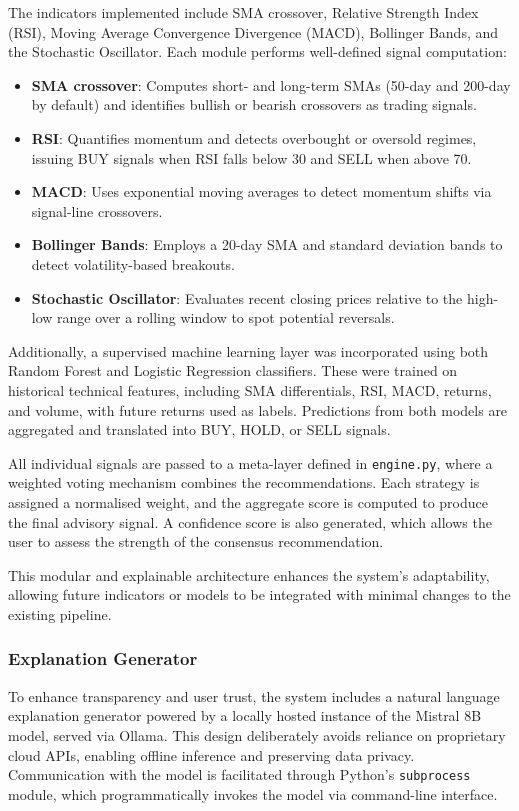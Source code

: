 The indicators implemented include SMA crossover, Relative Strength Index (RSI), Moving Average Convergence Divergence (MACD), Bollinger Bands, and the Stochastic Oscillator. Each module performs well-defined signal computation:
\begin{itemize}
\item \textbf{SMA crossover}: Computes short- and long-term SMAs (50-day and 200-day by default) and identifies bullish or bearish crossovers as trading signals.
\item \textbf{RSI}: Quantifies momentum and detects overbought or oversold regimes, issuing BUY signals when RSI falls below 30 and SELL when above 70.
\item \textbf{MACD}: Uses exponential moving averages to detect momentum shifts via signal-line crossovers.
\item \textbf{Bollinger Bands}: Employs a 20-day SMA and standard deviation bands to detect volatility-based breakouts.
\item \textbf{Stochastic Oscillator}: Evaluates recent closing prices relative to the high-low range over a rolling window to spot potential reversals.
\end{itemize}

Additionally, a supervised machine learning layer was incorporated using both Random Forest and Logistic Regression classifiers. These were trained on historical technical features, including SMA differentials, RSI, MACD, returns, and volume, with future returns used as labels. Predictions from both models are aggregated and translated into BUY, HOLD, or SELL signals.

All individual signals are passed to a meta-layer defined in \texttt{engine.py}, where a weighted voting mechanism combines the recommendations. Each strategy is assigned a normalised weight, and the aggregate score is computed to produce the final advisory signal. A confidence score is also generated, which allows the user to assess the strength of the consensus recommendation.

This modular and explainable architecture enhances the system’s adaptability, allowing future indicators or models to be integrated with minimal changes to the existing pipeline.

\subsubsection{Explanation Generator}

To enhance transparency and user trust, the system includes a natural language explanation generator powered by a locally hosted instance of the Mistral 8B model, served via Ollama. This design deliberately avoids reliance on proprietary cloud APIs, enabling offline inference and preserving data privacy. Communication with the model is facilitated through Python’s \texttt{subprocess} module, which programmatically invokes the model via command-line interface.

